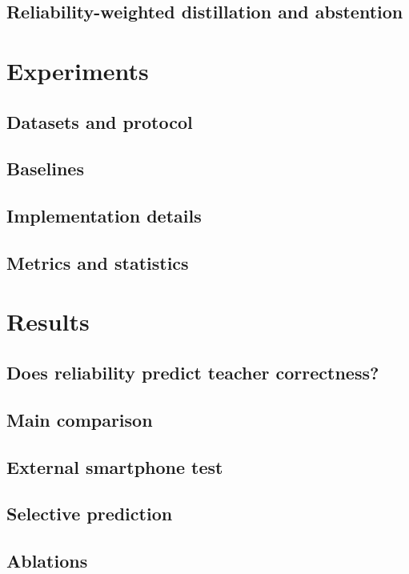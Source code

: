 \documentclass[journal,twoside,web]{IEEEtran}
\begin{document}
\subsection{Reliability-weighted distillation and abstention}

\section{Experiments}
\subsection{Datasets and protocol}   %
\subsection{Baselines}
\subsection{Implementation details}  %
\subsection{Metrics and statistics}

\section{Results}
\subsection{Does reliability predict teacher correctness?}  %
\subsection{Main comparison}                                %
\subsection{External smartphone test}
\subsection{Selective prediction}
\subsection{Ablations}
\end{document}
